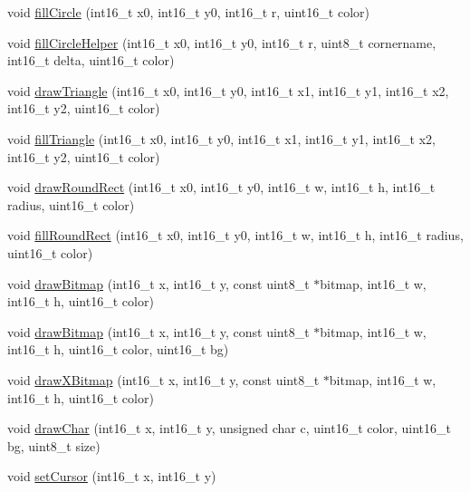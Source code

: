 \begin{DoxyCompactItemize}
void \hyperlink{class_adafruit___g_f_x_a623e031e58492fb41e9fde6a05d97c12}{fill\+Circle} (int16\+\_\+t x0, int16\+\_\+t y0, int16\+\_\+t r, uint16\+\_\+t color)
\item 
void \hyperlink{class_adafruit___g_f_x_a2242d3560b08c6480084152b6660052a}{fill\+Circle\+Helper} (int16\+\_\+t x0, int16\+\_\+t y0, int16\+\_\+t r, uint8\+\_\+t cornername, int16\+\_\+t delta, uint16\+\_\+t color)
\item 
void \hyperlink{class_adafruit___g_f_x_a49284b9cea16ecf8c15dfd0b51a841e6}{draw\+Triangle} (int16\+\_\+t x0, int16\+\_\+t y0, int16\+\_\+t x1, int16\+\_\+t y1, int16\+\_\+t x2, int16\+\_\+t y2, uint16\+\_\+t color)
\item 
void \hyperlink{class_adafruit___g_f_x_a4cd646a3d9c9d5b3ee50010d0aa387cd}{fill\+Triangle} (int16\+\_\+t x0, int16\+\_\+t y0, int16\+\_\+t x1, int16\+\_\+t y1, int16\+\_\+t x2, int16\+\_\+t y2, uint16\+\_\+t color)
\item 
void \hyperlink{class_adafruit___g_f_x_ab496b247abec724ef80e17a30257972b}{draw\+Round\+Rect} (int16\+\_\+t x0, int16\+\_\+t y0, int16\+\_\+t w, int16\+\_\+t h, int16\+\_\+t radius, uint16\+\_\+t color)
\item 
void \hyperlink{class_adafruit___g_f_x_a78dc59f6a508bcd3d5ac7af957b8b1ac}{fill\+Round\+Rect} (int16\+\_\+t x0, int16\+\_\+t y0, int16\+\_\+t w, int16\+\_\+t h, int16\+\_\+t radius, uint16\+\_\+t color)
\item 
void \hyperlink{class_adafruit___g_f_x_a50bf54503493152eeefa36f9768acec2}{draw\+Bitmap} (int16\+\_\+t x, int16\+\_\+t y, const uint8\+\_\+t $\ast$bitmap, int16\+\_\+t w, int16\+\_\+t h, uint16\+\_\+t color)
\item 
void \hyperlink{class_adafruit___g_f_x_a5225478b3f2afefcb16ed03e9fe93dc0}{draw\+Bitmap} (int16\+\_\+t x, int16\+\_\+t y, const uint8\+\_\+t $\ast$bitmap, int16\+\_\+t w, int16\+\_\+t h, uint16\+\_\+t color, uint16\+\_\+t bg)
\item 
void \hyperlink{class_adafruit___g_f_x_acec26bcf41c15ac6826c67e1f5e4cde6}{draw\+X\+Bitmap} (int16\+\_\+t x, int16\+\_\+t y, const uint8\+\_\+t $\ast$bitmap, int16\+\_\+t w, int16\+\_\+t h, uint16\+\_\+t color)
\item 
void \hyperlink{class_adafruit___g_f_x_ab7f5a29b3a3dffe30c6a3f4c1f604a5a}{draw\+Char} (int16\+\_\+t x, int16\+\_\+t y, unsigned char c, uint16\+\_\+t color, uint16\+\_\+t bg, uint8\+\_\+t size)
\item 
void \hyperlink{class_adafruit___g_f_x_aaf96a40cad0f34dd8ec73494b3866c33}{set\+Cursor} (int16\+\_\+t x, int16\+\_\+t y)

\end{DoxyCompactItemize}
